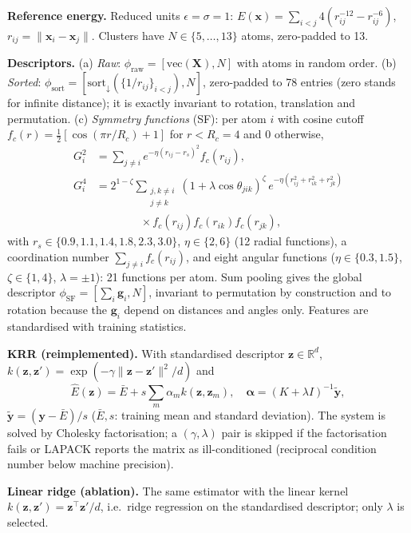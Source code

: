 \textbf{Reference energy.} Reduced units $\epsilon{=}\sigma{=}1$: $E(\mathbf{x})=\sum_{i<j}4\left(r_{ij}^{-12}-r_{ij}^{-6}\right)$, $r_{ij}=\lVert\mathbf{x}_i-\mathbf{x}_j\rVert$. Clusters have $N\in\{5,\dots,13\}$ atoms, zero-padded to 13.

\textbf{Descriptors.} (a) \emph{Raw}: $\phi_{\text{raw}}=[\mathrm{vec}(\mathbf{X}),N]$ with atoms in random order. (b) \emph{Sorted}: $\phi_{\text{sort}}=[\mathrm{sort}_{\downarrow}(\{1/r_{ij}\}_{i<j}),N]$, zero-padded to 78 entries (zero stands for infinite distance); it is exactly invariant to rotation, translation and permutation. (c) \emph{Symmetry functions} (SF): per atom $i$ with cosine cutoff $f_c(r)=\tfrac12[\cos(\pi r/R_c)+1]$ for $r<R_c{=}4$ and 0 otherwise,
\begin{align}
G^{2}_{i}&=\sum_{j\ne i}e^{-\eta(r_{ij}-r_s)^2}f_c(r_{ij}),\\
G^{4}_{i}&=2^{1-\zeta}\!\!\sum_{\substack{j,k\ne i\\ j\neq k}}\!(1+\lambda\cos\theta_{jik})^{\zeta}\,
e^{-\eta(r_{ij}^2+r_{ik}^2+r_{jk}^2)}\nonumber\\
&\qquad\qquad\times f_c(r_{ij})f_c(r_{ik})f_c(r_{jk}),
\end{align}
with $r_s\in\{0.9,1.1,1.4,1.8,2.3,3.0\}$, $\eta\in\{2,6\}$ (12 radial functions), a coordination number $\sum_{j\neq i}f_c(r_{ij})$, and eight angular functions ($\eta\in\{0.3,1.5\}$, $\zeta\in\{1,4\}$, $\lambda=\pm1$): 21 functions per atom. Sum pooling gives the global descriptor $\phi_{\text{SF}}=[\sum_i \mathbf{g}_i,N]$, invariant to permutation by construction and to rotation because the $\mathbf g_i$ depend on distances and angles only. Features are standardised with training statistics.

\textbf{KRR (reimplemented).} With standardised descriptor $\mathbf{z}\in\mathbb{R}^d$, $k(\mathbf z,\mathbf z')=\exp(-\gamma\lVert\mathbf z-\mathbf z'\rVert^2/d)$ and
\begin{equation}
\hat E(\mathbf z)=\bar E+s\sum_m\alpha_m k(\mathbf z,\mathbf z_m),\quad \boldsymbol\alpha=(K+\lambda I)^{-1}\tilde{\mathbf y},
\end{equation}
$\tilde{\mathbf y}=(\mathbf y-\bar E)/s$ ($\bar E,s$: training mean and standard deviation). The system is solved by Cholesky factorisation; a $(\gamma,\lambda)$ pair is skipped if the factorisation fails or LAPACK reports the matrix as ill-conditioned (reciprocal condition number below machine precision).

\textbf{Linear ridge (ablation).} The same estimator with the linear kernel $k(\mathbf z,\mathbf z')=\mathbf z^{\top}\mathbf z'/d$, i.e.\ ridge regression on the standardised descriptor; only $\lambda$ is selected.

